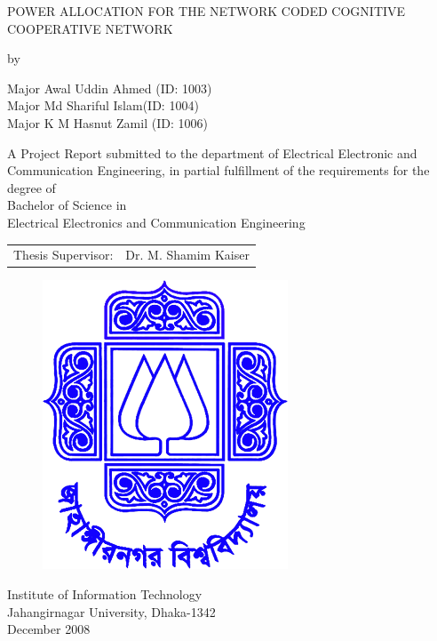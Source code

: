 
\newpage
\begin{singlespace}
\begin{center}
	\uppercase{\textbf \Large{
		POWER ALLOCATION FOR THE NETWORK CODED COGNITIVE COOPERATIVE NETWORK \\
	}}
	\vspace{3em}

	by

	\vspace{3em}
	Major Awal Uddin Ahmed (ID: 1003)\\
	Major Md Shariful Islam(ID: 1004)\\
	Major K M Hasnut Zamil (ID: 1006)
	

	\vspace{4em}
	
	A Project Report submitted to the department of
Electrical Electronic and Communication Engineering,
in partial fulfillment of the requirements for the degree of\\
	Bachelor of Science in\\
	

	Electrical Electronics and Communication Engineering
		\vspace{8em}
	
	\begin{tabular}{rl}
		Thesis Supervisor:	& Dr. M. Shamim Kaiser \\[-0.8em]
															
		
	\end{tabular}
	
\vfill
	
	\begin{figure}[ht]
	\centering
		\includegraphics[scale=0.2]{JU-logo}
\end{figure}
\par

	Institute of Information Technology \\
	Jahangirnagar University, Dhaka-1342 \\
	December 2008 \\
\end{center}
\end{singlespace} 